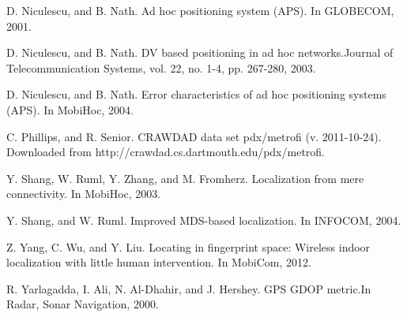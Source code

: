 \documentclass[10pt, conference, letterpaper]{IEEEtran}
\begin{document}
\begin{thebibliography}{99}
\vspace{-0.35ex}

D. Niculescu, and B. Nath. Ad hoc positioning system (APS). In GLOBECOM, 2001.

\vspace{-0.35ex}

D. Niculescu, and B. Nath. DV based positioning in ad hoc networks.Journal of Telecommunication Systems, vol. 22, no. 1-4, pp. 267-280, 2003.

\vspace{-0.35ex}

D. Niculescu, and B. Nath. Error characteristics of ad hoc positioning systems (APS). In MobiHoc, 2004.

\vspace{-0.35ex}

C. Phillips, and R. Senior. CRAWDAD data set pdx/metrofi (v. 2011-10-24). Downloaded from http://crawdad.cs.dartmouth.edu/pdx/metrofi.

\vspace{-0.35ex}

Y. Shang, W. Ruml, Y. Zhang, and M. Fromherz. Localization from mere connectivity. In MobiHoc, 2003.

\vspace{-0.35ex}

Y. Shang, and W. Ruml. Improved MDS-based localization. In INFOCOM, 2004.

\vspace{-0.35ex}

Z. Yang, C. Wu, and Y. Liu. Locating in fingerprint space: Wireless indoor localization with little human intervention. In MobiCom, 2012.

\vspace{-0.35ex}

R. Yarlagadda, I. Ali, N. Al-Dhahir, and J. Hershey. GPS GDOP metric.In Radar, Sonar Navigation, 2000.

\vspace{-0.35ex}

\end{thebibliography}
\end{document}
